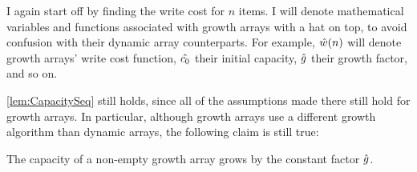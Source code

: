 \HdrGrowthArrayImpl

\HdrTimeComplex

I again start off by finding the write cost for $n$ items. I will denote mathematical variables and functions associated with growth arrays with a hat on top, to avoid confusion with their dynamic array counterparts. For example, $\hat{w}(n)$ will denote growth arrays' write cost function, $\hat{c_0}$ their initial capacity, $\hat{g}$ their growth factor, and so on.

\ref{lem:CapacitySeq} still holds, since all of the assumptions made there still hold for growth arrays. In particular, although growth arrays use a different growth algorithm than dynamic arrays, the following claim is still true:

\begin{lemma}
\label{lem:GrowthArraysGrowthFactor}
	The capacity of a non-empty growth array grows by the constant factor $\hat{g}$.
\end{lemma}

